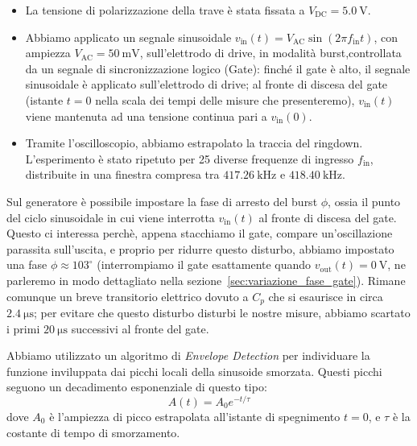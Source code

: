 \documentclass[11pt,a4paper]{article}
\begin{document}
\begin{itemize}
    \item La tensione di polarizzazione della trave è stata fissata a $V_{\text{DC}} = \SI{5.0}{\volt}$.
    \item Abbiamo applicato un segnale sinusoidale $v_{\text{in}}(t) = V_{\text{AC}} \sin(2\pi f_{\text{in}} t)$, con ampiezza $V_{\text{AC}} = \SI{50}{\milli\volt}$, sull'elettrodo di drive, in modalità burst,controllata da un segnale di sincronizzazione logico (Gate): finché il gate è alto, il segnale sinusoidale è applicato sull'elettrodo di drive; al fronte di discesa del gate (istante $t = 0$ nella scala dei tempi delle misure che presenteremo), $v_{\text{in}}(t)$ viene mantenuta ad una tensione continua pari a $v_{\text{in}}(0)$.
    \item Tramite l'oscilloscopio, abbiamo estrapolato la traccia del ringdown. L'esperimento è stato ripetuto per 25 diverse frequenze di ingresso $f_{\text{in}}$, distribuite in una finestra compresa tra $\SI{417.26}{\kilo\hertz}$ e $\SI{418.40}{\kilo\hertz}$.
\end{itemize}


\vspace{0.3cm}

\noindent Sul generatore è possibile impostare la fase di arresto del burst $\phi$, ossia il punto del ciclo sinusoidale in cui viene interrotta $v_{\text{in}}(t)$ al fronte di discesa del gate. Questo ci interessa perchè, appena stacchiamo il gate, compare un'oscillazione parassita sull'uscita, e proprio per ridurre questo disturbo, abbiamo impostato una fase $\phi \approx 103^\circ$ (interrompiamo il gate esattamente quando $v_{\text{out}}(t)=\SI{0}{\volt}$, ne parleremo in modo dettagliato nella sezione~\ref{sec:variazione_fase_gate}). Rimane comunque un breve transitorio elettrico dovuto a $C_p$ che si esaurisce in circa $\SI{2.4}{\micro\second}$; per evitare che questo disturbo disturbi le nostre misure, abbiamo scartato i primi $\SI{20}{\micro\second}$ successivi al fronte del gate. 

\vspace{0.3cm}
\noindent Abbiamo utilizzato un algoritmo di \textit{Envelope Detection} per individuare la funzione inviluppata dai picchi locali della sinusoide smorzata. Questi picchi seguono un decadimento esponenziale di questo tipo:
\begin{equation}
        \label{eq:legge_decadimento}
        A(t) = A_0 e^{-t/\tau}
    \end{equation}
dove $A_0$ è l'ampiezza di picco estrapolata all'istante di spegnimento $t=0$, e $\tau$ è la costante di tempo di smorzamento.
\end{document}
